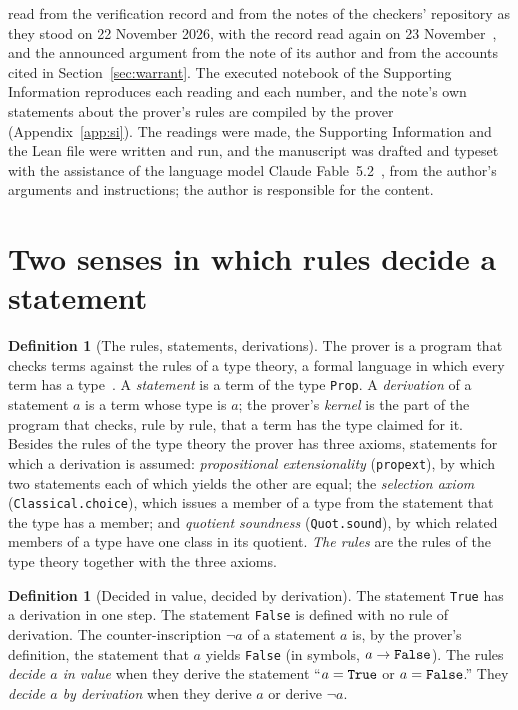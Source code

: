\documentclass[11pt]{article}
\theoremstyle{definition}
\newtheorem{definition}[theorem]{Definition}
\theoremstyle{remark}
\DeclareRobustCommand{\lean}[1]{{\renewcommand{\_}{\textunderscore\allowbreak}\texttt{#1}}}
\newcommand{\True}{\lean{True}}
\newcommand{\False}{\lean{False}}
\begin{document}
read from the verification record and from the notes of the checkers' repository as they stood on 22 November 2026, with the record read again on 23 November~\citep{sutherland,leannotes}, and the announced argument from the note of its author and from the accounts cited in Section~\ref{sec:warrant}. The executed notebook of the Supporting Information reproduces each reading and each number, and the note's own statements about the prover's rules are compiled by the prover (Appendix~\ref{app:si}). The readings were made, the Supporting Information and the Lean file were written and run, and the manuscript was drafted and typeset with the assistance of the language model Claude Fable~5.2~\citep{claude}, from the author's arguments and instructions; the author is responsible for the content.

\section{Two senses in which rules decide a statement}\label{sec:two}

\begin{definition}[The rules, statements, derivations]\label{def:rules}
The prover is a program that checks terms against the rules of a type theory, a formal language in which every term has a type~\citep{lean4,carneiro}. A \emph{statement} is a term of the type \lean{Prop}. A \emph{derivation} of a statement $a$ is a term whose type is $a$; the prover's \emph{kernel} is the part of the program that checks, rule by rule, that a term has the type claimed for it. Besides the rules of the type theory the prover has three axioms, statements for which a derivation is assumed: \emph{propositional extensionality} (\lean{propext}), by which two statements each of which yields the other are equal; the \emph{selection axiom} (\lean{Classical.choice}), which issues a member of a type from the statement that the type has a member; and \emph{quotient soundness} (\lean{Quot.sound}), by which related members of a type have one class in its quotient. \emph{The rules} are the rules of the type theory together with the three axioms.
\end{definition}

\begin{definition}[Decided in value, decided by derivation]\label{def:decided}
The statement \True{} has a derivation in one step. The statement \False{} is defined with no rule of derivation. The counter-inscription $\neg a$ of a statement $a$ is, by the prover's definition, the statement that $a$ yields \False{} (in symbols, $a\to\False$). The rules \emph{decide $a$ in value} when they derive the statement ``$a=\True$ or $a=\False$.'' They \emph{decide $a$ by derivation} when they derive $a$ or derive $\neg a$.
\end{definition}
\end{document}
